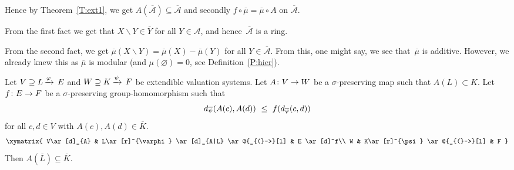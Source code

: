 \begin{ex}
Hence by Theorem~\ref{T:ext1},
we get $A(\overline{\mathcal{A}})\subseteq \overline{\mathcal{A}}$
and secondly
  $f\circ\overline\mu=\overline \mu \circ A$ on $\overline{\mathcal{A}}$.

From the first fact
we get that $X\backslash Y \in \overline{Y}$
for all $Y\in \mathcal{A}$,
and hence~$\overline{\mathcal{A}}$ is a ring.

From the second fact,
we get $\overline\mu (X\backslash Y)
= \overline\mu(X) - \overline\mu(Y)$
for all $Y\in \overline{\mathcal{A}}$.
From this,
one might say,
we see that~$\overline\mu$ is additive.
However, we already knew this
as $\overline\mu$ is modular
(and $\mu(\varnothing)=0$, see Definition~\ref{P:hier}).
\end{ex}
%
%
\begin{thm}
\label{T:ext2}
Let $V \supseteq L\,\smash{\xrightarrow{\varphi}\,E}$ and
 $W \supseteq K\,\smash{\xrightarrow{\psi}\,F}$ be extendible valuation systems.
Let
$A\colon V\rightarrow W$
be a $\sigma$-preserving map
such that $A(L)\subset K$.
Let $f\colon E\rightarrow F$ be a $\sigma$-preserving group-homomorphism
such that
\begin{equation}
\label{eq:T:ext2-as}
\ld{\overline{\psi}}(A(c),A(d))\ \leq\  f(\ld{\overline{\varphi}}(c,d))
\end{equation}
for all $c,d\in V$ with $A(c),A(d)\in \overline K$.
\begin{equation*}
\xymatrix{
V\ar[d]_{A} & 
  L\ar[r]^{\varphi} \ar[d]_{A|L} \ar @{_{(}->}[l] & 
  E \ar[d]^f\\
W &
  K\ar[r]^{\psi} \ar @{_{(}->}[l] & 
  F
}\end{equation*}
Then $A(\overline{L})\subseteq \overline{K}$.
\end{thm}
